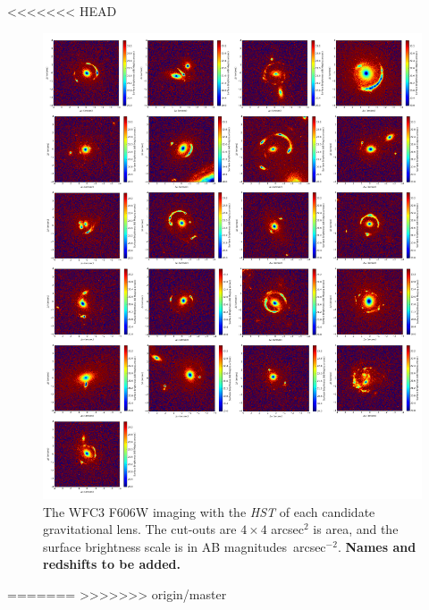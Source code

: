 \documentclass[a4paper,fleqn,usenatbib]{mnras}
\begin{document}
<<<<<<< HEAD
\begin{figure}
\begin{center} 
\includegraphics[width=\textwidth]{sample.pdf}
\caption{The WFC3 F606W imaging with the {\it HST} of each candidate gravitational lens. The cut-outs are $4\times4$ arcsec$^2$ is area, and the surface brightness scale is in AB magnitudes~arcsec$^{-2}$. {\bf Names and redshifts to be added.}}
\label{fig:sample}
\end{center}     
 \end{figure}
=======
>>>>>>> origin/master
\end{document}
